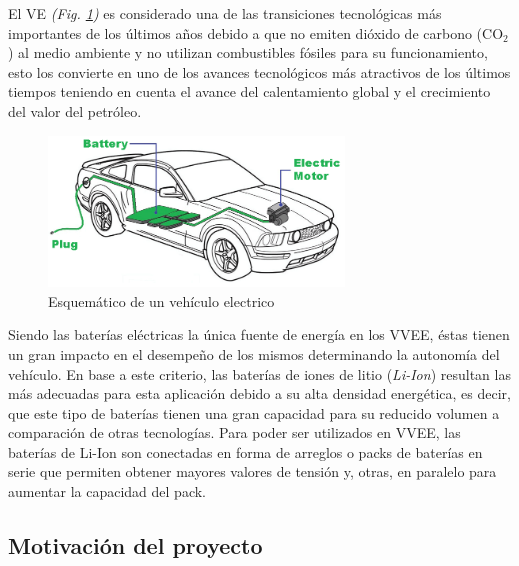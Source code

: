 \documentclass[10pt, a4paper]{article}
\begin{document}
\noindent El \acrfull{VE} \emph{(Fig. \ref{EV})} es considerado 
una de las transiciones tecnológicas más importantes de los últimos años 
debido a que no emiten dióxido de carbono ($\mathrm{CO_2}$) al medio 
ambiente y no utilizan combustibles fósiles para su funcionamiento, esto 
los convierte en uno de los avances tecnológicos más atractivos de los 
últimos tiempos teniendo en cuenta el avance del calentamiento global y el 
crecimiento del valor del petróleo.

\begin{figure}[h!]
    \begin{center}
	\includegraphics[width=0.7\textwidth]{EV.png}
	\caption{Esquem\'atico de un veh\'iculo electrico}
	\label{EV}
    \end{center}
\end{figure}

\noindent Siendo las baterías eléctricas la única fuente de energía en los 
\acrfull{VVEE}, éstas tienen un gran impacto en el desempeño de los mismos 
determinando la autonomía del vehículo. En base a este criterio, las 
baterías de iones de litio (\emph{Li-Ion}) resultan las más adecuadas para 
esta aplicación debido a su alta densidad energética, es decir, que este 
tipo de baterías tienen una gran capacidad para su reducido volumen a 
comparación de otras tecnologías. Para poder ser utilizados en
\acrshort{VVEE}, las baterías de Li-Ion son conectadas en forma de arreglos 
o packs de baterías en serie que permiten obtener mayores valores de tensión
y, otras, en paralelo para aumentar la capacidad del pack.

\subsection{Motivaci\'on del proyecto}
\end{document}
